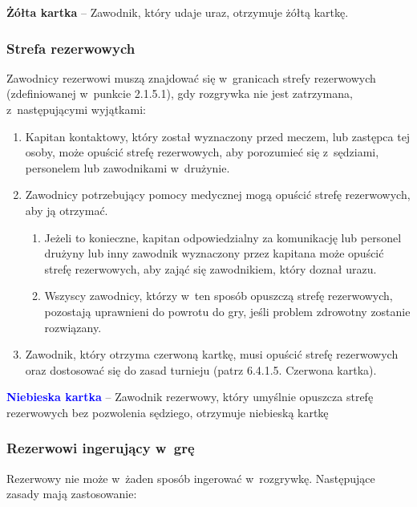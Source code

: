 \documentclass[12pt,a4paper]{article}
\newcommand\yellowcard[1]{\bgroup\textcolor{darkyellow}{\textbf{#1}}}
\newcommand\bluecard[1]{\bgroup\textcolor{blue}{\textbf{#1}}}
\begin{document}
\yellowcard{Żółta kartka} -- Zawodnik, który udaje uraz, otrzymuje żółtą
kartkę.

\subsubsection{Strefa rezerwowych}

Zawodnicy rezerwowi muszą znajdować się w~granicach strefy rezerwowych
(zdefiniowanej w~punkcie 2.1.5.1), gdy rozgrywka nie jest zatrzymana, z~następującymi wyjątkami:

\begin{enumerate}
	\item
	      Kapitan kontaktowy, który został wyznaczony przed meczem, lub zastępca
	      tej osoby, może opuścić strefę rezerwowych, aby porozumieć się z~sędziami, personelem lub zawodnikami w~drużynie.
	\item
	      Zawodnicy potrzebujący pomocy medycznej mogą opuścić strefę
	      rezerwowych, aby ją otrzymać.

	      \begin{enumerate}
		      \item
		            Jeżeli to konieczne, kapitan odpowiedzialny za komunikację lub
		            personel drużyny lub inny zawodnik wyznaczony przez kapitana może
		            opuścić strefę rezerwowych, aby zająć się zawodnikiem, który doznał
		            urazu.
		      \item
		            Wszyscy zawodnicy, którzy w~ten sposób opuszczą strefę rezerwowych,
		            pozostają uprawnieni do powrotu do gry, jeśli problem zdrowotny
		            zostanie rozwiązany.
	      \end{enumerate}
	\item
	      Zawodnik, który otrzyma czerwoną kartkę, musi opuścić strefę
	      rezerwowych oraz dostosować się do zasad turnieju (patrz 6.4.1.5.
	      Czerwona kartka).
\end{enumerate}

\bluecard{Niebieska kartka} -- Zawodnik rezerwowy, który umyślnie opuszcza
strefę rezerwowych bez pozwolenia sędziego, otrzymuje niebieską kartkę

\subsubsection{Rezerwowi ingerujący w~grę}

Rezerwowy nie może w~żaden sposób ingerować w~rozgrywkę. Następujące
zasady mają zastosowanie:
\end{document}
